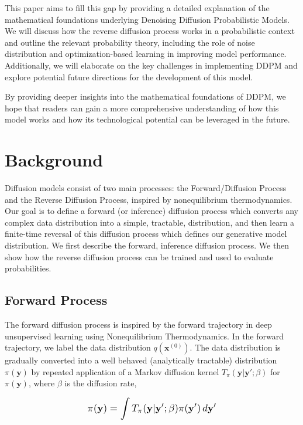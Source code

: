 \documentclass{article}
\newcommand*{\Scale}[2][4]{\scalebox{#1}{\ensuremath{#2}}}
\begin{document}
This paper aims to fill this gap by providing a detailed explanation of the mathematical foundations underlying Denoising Diffusion Probabilistic Models. We will discuss how the reverse diffusion process works in a probabilistic context and outline the relevant probability theory, including the role of noise distribution and optimization-based learning in improving model performance. Additionally, we will elaborate on the key challenges in implementing DDPM and explore potential future directions for the development of this model.

By providing deeper insights into the mathematical foundations of DDPM, we hope that readers can gain a more comprehensive understanding of how this model works and how its technological potential can be leveraged in the future.


\section{Background}


Diffusion models consist of two main processes: the Forward/Diffusion Process and the Reverse Diffusion Process, inspired by nonequilibrium thermodynamics. Our goal is to define a forward (or inference) diffusion process which converts any complex data distribution into a simple, tractable, distribution, and then learn a finite-time reversal of this diffusion process which defines our generative model distribution. We first describe the forward, inference diffusion process. We then show how the reverse diffusion process can be trained and used to evaluate probabilities.


\subsection{Forward Process}


The forward diffusion process is inspired by the forward trajectory in deep unsupervised learning using Nonequilibrium Thermodynamics. In the forward trajectory, we label the data distribution $ q(\textbf{x}^{(0)}) $. The data distribution is gradually converted into a well behaved (analytically tractable) distribution $ \pi(\textbf{y}) $ by repeated application of a Markov diffusion kernel $ T_{\pi}(\textbf{y}|\textbf{y}';\beta) $ for $ \pi(\textbf{y}) $, where $ \beta $ is the diffusion rate,

\begin{equation}
    \Scale[1.2]{ \displaystyle
        \pi(\textbf{y}) = \int T_{\pi}(\textbf{y}|\textbf{y}';\beta) \pi(\textbf{y}') \,d\textbf{y}'
    }
\end{equation}
\end{document}
